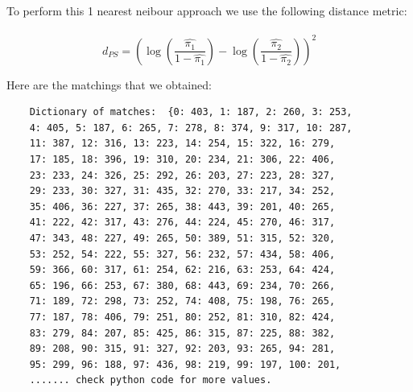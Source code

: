 \documentclass{article}
\begin{document}
To perform this 1 nearest neibour approach we use the following distance metric:\\
\\
\begin{displaymath}
    d_{PS} = (\log(\frac{\hat{\pi_1}}{1-\hat{\pi_1}})-\log(\frac{\hat{\pi_2}}{1-\hat{\pi_2}}))^2
\end{displaymath}

Here are the matchings that we obtained:\\
\begin{verbatim}
    Dictionary of matches:  {0: 403, 1: 187, 2: 260, 3: 253, 
    4: 405, 5: 187, 6: 265, 7: 278, 8: 374, 9: 317, 10: 287, 
    11: 387, 12: 316, 13: 223, 14: 254, 15: 322, 16: 279, 
    17: 185, 18: 396, 19: 310, 20: 234, 21: 306, 22: 406, 
    23: 233, 24: 326, 25: 292, 26: 203, 27: 223, 28: 327, 
    29: 233, 30: 327, 31: 435, 32: 270, 33: 217, 34: 252, 
    35: 406, 36: 227, 37: 265, 38: 443, 39: 201, 40: 265, 
    41: 222, 42: 317, 43: 276, 44: 224, 45: 270, 46: 317, 
    47: 343, 48: 227, 49: 265, 50: 389, 51: 315, 52: 320, 
    53: 252, 54: 222, 55: 327, 56: 232, 57: 434, 58: 406, 
    59: 366, 60: 317, 61: 254, 62: 216, 63: 253, 64: 424, 
    65: 196, 66: 253, 67: 380, 68: 443, 69: 234, 70: 266, 
    71: 189, 72: 298, 73: 252, 74: 408, 75: 198, 76: 265, 
    77: 187, 78: 406, 79: 251, 80: 252, 81: 310, 82: 424, 
    83: 279, 84: 207, 85: 425, 86: 315, 87: 225, 88: 382, 
    89: 208, 90: 315, 91: 327, 92: 203, 93: 265, 94: 281, 
    95: 299, 96: 188, 97: 436, 98: 219, 99: 197, 100: 201, 
    ....... check python code for more values.
\end{verbatim}
\end{document}
